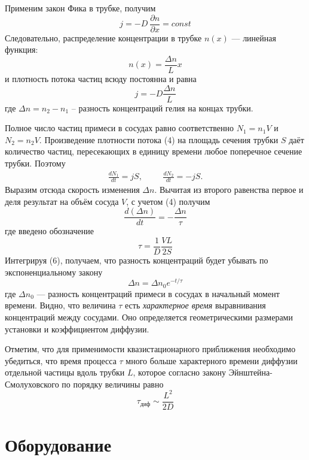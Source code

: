 \documentclass[a4paper,12pt]{article}
\theoremstyle{plain} %
\theoremstyle{definition} %
\theoremstyle{remark} %
\begin{document}
 \noindent Применим закон Фика в трубке, получим
 \[j = -D\ \frac{\partial n}{\partial x} = const\]
Следовательно, распределение концентрации в трубке $n(x)$ — линейная функция:
\begin{equation}
n(x) = \frac{\Delta n}{L}x
\end{equation}
и плотность потока частиц всюду постоянна и равна
\begin{equation}
j = -D \frac{\Delta n}{L}
\end{equation}
где $\Delta n = n_2- n_1$ -- разность концентраций гелия на концах трубки.

Полное число частиц примеси в сосудах равно соответственно $N_1 = n_1V$ и $N_2 = n_2 V$. Произведение плотности потока (4) на площадь сечения трубки $S$ даёт количество частиц, пересекающих в единицу времени любое поперечное сечение трубки. Поэтому
\begin{equation}
\begin{aligned}
\frac{dN_1}{dt} = jS, & & & \frac{dN_2}{dt} = -jS.
\end{aligned}
\end{equation}
Выразим отсюда скорость изменения $\Delta n$. Вычитая из второго равенства первое и деля результат на объём сосуда $V$, с учетом (4) получим
\begin{equation}
\frac{d(\Delta n)}{dt} = - \frac{\Delta n}{\tau}
\end{equation}
где введено обозначение
\begin{equation}
\tau = \frac{1}{D}\frac{VL}{2S}
\end{equation}
Интегрируя (6), получаем, что разность концентраций будет убывать по экспоненциальному закону
\begin{equation}
\Delta n = \Delta n_0 e^{-t/\tau}
\end{equation}
где $\Delta n_0$ — разность концентраций примеси в сосудах в начальный момент времени. Видно, что величина $\tau$ есть \textit{характерное время} выравнивания концентраций между сосудами. Оно определяется геометрическими размерами установки и коэффициентом диффузии.

Отметим, что для применимости квазистационарного приближения необходимо убедиться, что время процесса $\tau$ много больше характерного времени диффузии отдельной частицы вдоль трубки $L$, которое согласно
закону Эйнштейна-Смолуховского по порядку величины равно
\begin{equation}
\tau_{\text{диф}} \sim \frac{L^2}{2 D}
\end{equation}
\section{Оборудование}
\end{document}
